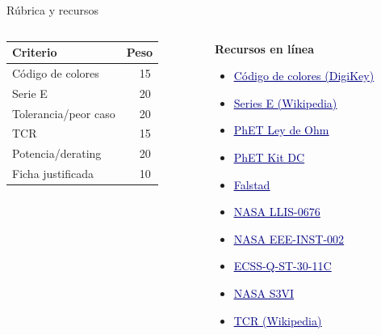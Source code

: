 \documentclass[aspectratio=169]{beamer}
\newcommand{\enlace}[2]{\href{#1}{\textcolor{navy}{\underline{#2}}}}
\begin{document}
\begin{frame}{Rúbrica y recursos}
  \begin{columns}[T]
    \begin{column}{0.44\textwidth}
      \begin{table}
        \small
        \begin{tabular}{lr}
          \toprule
          Criterio & Peso \\
          \midrule
          Código de colores & 15\,\text{\%} \\
          Serie E & 20\,\text{\%} \\
          Tolerancia/peor caso & 20\,\text{\%} \\
          TCR & 15\,\text{\%} \\
          Potencia/derating & 20\,\text{\%} \\
          Ficha justificada & 10\,\text{\%} \\
          \bottomrule
        \end{tabular}
      \end{table}
    \end{column}
    \begin{column}{0.52\textwidth}
      \small\textbf{Recursos en línea}
      \begin{itemize}
        \item \enlace{https://www.digikey.com/en/resources/conversion-calculators/conversion-calculator-resistor-color-code}{Código de colores (DigiKey)}
        \item \enlace{https://en.wikipedia.org/wiki/E_series_of_preferred_numbers}{Series E (Wikipedia)}
        \item \enlace{https://phet.colorado.edu/sims/html/ohms-law/latest/ohms-law_en.html}{PhET Ley de Ohm}
        \item \enlace{https://phet.colorado.edu/sims/html/circuit-construction-kit-dc/latest/circuit-construction-kit-dc_en.html}{PhET Kit DC}
        \item \enlace{https://www.falstad.com/circuit/}{Falstad}
        \item \enlace{https://llis.nasa.gov/lesson/676}{NASA LLIS-0676}
        \item \enlace{https://snebulos.mit.edu/projects/reference/NASA-Generic/EEE-INST-002-DeratingPages.pdf}{NASA EEE-INST-002}
        \item \enlace{https://ecss.nl/standard/ecss-q-st-30-11c-derating-eee-components/}{ECSS-Q-ST-30-11C}
        \item \enlace{https://s3vi.ndc.nasa.gov/ssri-kb/static/resources/electronic-circuit-design-and-analysis-for-space-applications.pdf}{NASA S3VI}
        \item \enlace{https://en.wikipedia.org/wiki/Temperature_coefficient}{TCR (Wikipedia)}
      \end{itemize}
    \end{column}
  \end{columns}
\end{frame}
\end{document}
